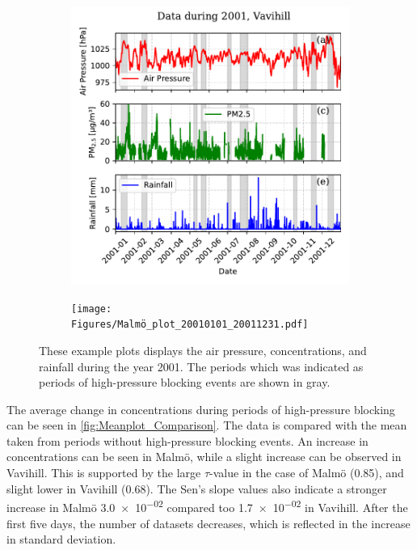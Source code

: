 \begin{figure}[H]
    \centering
    \begin{subfigure}[b]{0.49\textwidth}
        \centering
        \includegraphics[width=\textwidth]{Figures/Vavihill_plot_20010101_20011231.pdf}
        \label{fig:2001Vavihill}
    \end{subfigure}
    \hfill
    \begin{subfigure}[b]{0.49\textwidth}
        \centering
        \texttt{[image: Figures/Malmö\_plot\_20010101\_20011231.pdf]}
        \label{fig:2001Malmö}
    \end{subfigure}
    \caption{These example plots displays the air pressure, \PM  concentrations, and rainfall during the year 2001. The periods which was indicated as periods of high-pressure blocking events are shown in gray. }
    \label{fig:2001}
\end{figure}

The average change in \PM concentrations during periods of high-pressure blocking can be seen in \autoref{fig:Meanplot_Comparison}. The data is compared with the \PM mean taken from periods without high-pressure blocking events. An increase in \PM concentrations can be seen in Malmö, while a slight increase can be observed in Vavihill. This is supported by the large $\tau$-value in the case of Malmö (0.85), and slight lower in Vavihill (0.68). The Sen's slope values also indicate a stronger increase in Malmö \SI{3.0e-02}{} compared too \SI{1.7e-02}{} in Vavihill. After the first five days, the number of datasets decreases, which is reflected in the increase in standard deviation.


